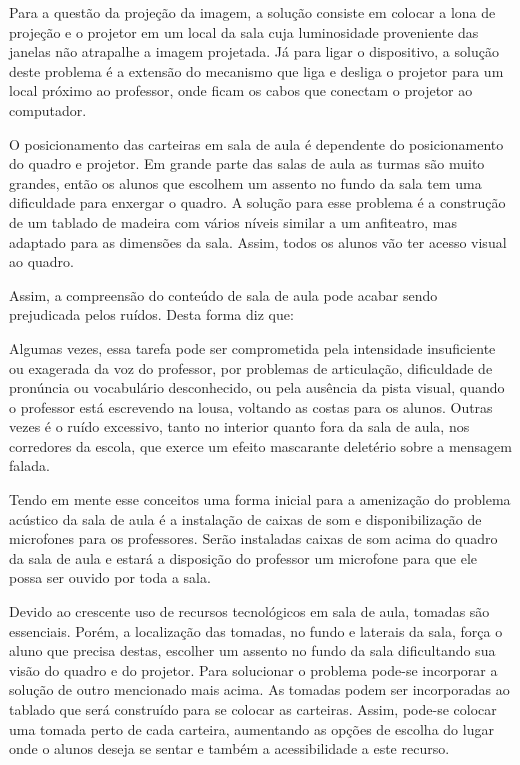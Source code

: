 Para a questão da projeção da imagem, a solução consiste em colocar a lona de projeção e o projetor em um local da sala cuja luminosidade proveniente das janelas não atrapalhe a imagem projetada. Já para ligar o dispositivo, a solução deste problema é a extensão do mecanismo que liga e desliga o projetor para um local próximo ao professor, onde ficam os cabos que conectam o projetor ao computador.

O posicionamento das carteiras em sala de aula é dependente do posicionamento do quadro e projetor. Em grande parte das salas de aula as turmas são muito grandes, então os alunos que escolhem um assento no fundo da sala tem uma dificuldade para enxergar o quadro. A solução para esse problema é a construção de um tablado de madeira com vários níveis similar a um anfiteatro, mas adaptado para as dimensões da sala. Assim, todos os alunos vão ter acesso visual ao quadro.

Assim, a compreensão do conteúdo de sala de aula pode acabar sendo prejudicada pelos ruídos. Desta forma \cite{russo1999} diz que:
\begin{citacao}
Algumas vezes, essa tarefa pode ser comprometida pela intensidade insuficiente ou exagerada da voz do professor, por problemas de articulação, dificuldade de pronúncia ou vocabulário desconhecido, ou pela ausência da pista visual, quando o professor está escrevendo na lousa, voltando as costas para os alunos. Outras vezes é o ruído excessivo, tanto no interior quanto fora da sala de aula, nos corredores da escola, que exerce um efeito mascarante deletério sobre a mensagem falada.
\end{citacao}

Tendo em mente esse conceitos uma forma inicial para a amenização do problema acústico da sala de aula é a instalação de caixas de som e disponibilização de microfones para os professores. Serão instaladas caixas de som acima do quadro da sala de aula e estará a disposição do professor um microfone para que ele possa ser ouvido por toda a sala.

Devido ao crescente uso de recursos tecnológicos em sala de aula, tomadas são essenciais. Porém, a localização das tomadas, no fundo e laterais da sala, força o aluno que precisa destas, escolher um assento no fundo da sala dificultando sua visão do quadro e do projetor. Para solucionar o problema pode-se incorporar a solução de outro mencionado mais acima. As tomadas podem ser incorporadas ao tablado que será construído para se colocar as carteiras. Assim, pode-se colocar uma tomada perto de cada carteira, aumentando as opções de escolha do lugar onde o alunos deseja se sentar e também a acessibilidade a este recurso.


